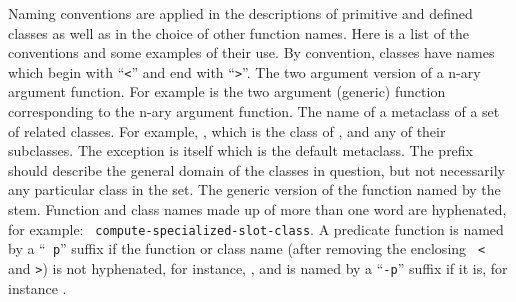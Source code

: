 %
\begin{optDefinition}
Naming conventions are applied in the descriptions of primitive and
defined classes as well as in the choice of other function names.
Here is a list of the conventions and some examples of their use.
%
 By convention, classes have names
which begin with ``{\tt <}'' and end with ``{\tt >}''.
%
 The two argument version of a n-ary
argument function.  For example  is the two argument
(generic) function corresponding to the n-ary argument \functionref{+} function.
%
%
 The name of a metaclass of a set of
related classes.  For example, , which is the class of
,  and any of their
subclasses.  The exception is  itself which is the default
metaclass.  The prefix should describe the general domain of the classes in
question, but not necessarily any particular class in the set.
%
 The generic version of the function
named by the stem.
%
 Function and class names made up of more than one
word are hyphenated, for example: {\tt
    compute-specialized-slot-class}.
%
%
%
 A predicate function is named by a ``{\tt
    p}'' suffix if the function or class name (after removing the enclosing {\tt
    <} and {\tt >}) is not hyphenated, for instance, , and is
named by a ``{\tt -p}'' suffix if it is, for instance
.
%
%

\end{optDefinition}
